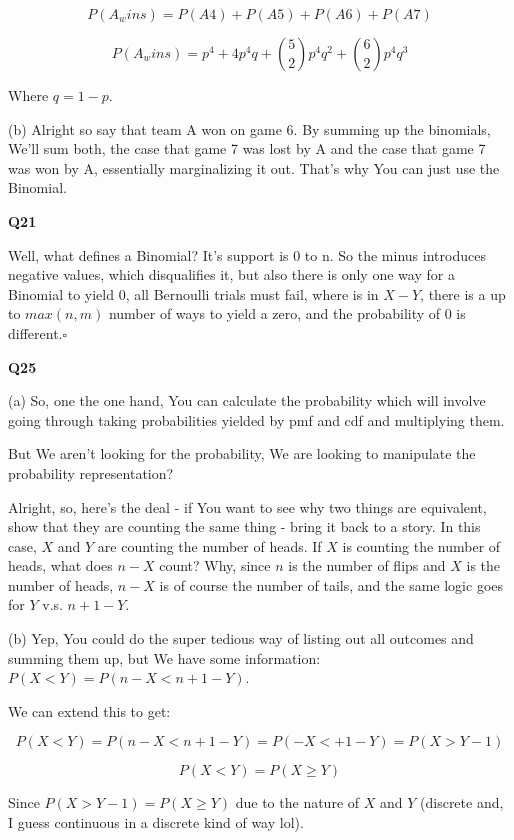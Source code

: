 \documentclass{article}
\newcommand{\qed}{\hfill$\square$}
\begin{document}
			$$P(A_wins) = P(A4) + P(A5) + P(A6) + P(A7)$$
			
			$$P(A_wins) = p^4 + 4p^4q + {5 \choose 2}p^4q^2 + {6 \choose 2}p^4q^3$$
			
			Where $q = 1-p$.
			
			(b) Alright so say that team A won on game 6. By summing up the binomials, We'll sum both, the case that game 7 was lost by A and the case that game 7 was won by A, essentially marginalizing it out. That's why You can just use the Binomial.
			
			\hfill
			
		\textbf{Q21}
		
			Well, what defines a Binomial? It's support is 0 to n. So the minus introduces negative values, which disqualifies it, but also there is only one way for a Binomial to yield 0, all Bernoulli trials must fail, where is in $X-Y$, there is a up to $max(n, m)$ number of ways to yield a zero, and the probability of 0 is different.\qed
			
			\hfill
			
		\textbf{Q25}
			
			(a) So, one the one hand, You can calculate the probability which will involve going through taking probabilities yielded by pmf and cdf and multiplying them.
			
			But We aren't looking for the probability, We are looking to manipulate the probability representation?
			
			Alright, so, here's the deal - if You want to see why two things are equivalent, show that they are counting the same thing - bring it back to a story. In this case, $X$ and $Y$ are counting the number of heads. If $X$ is counting the number of heads, what does $n - X$ count? Why, since $n$ is the number of flips and $X$ is the number of heads, $n - X$ is of course the number of tails, and the same logic goes for $Y$ v.s. $n + 1 - Y$.
			
			(b) Yep, You could do the super tedious way of listing out all outcomes and summing them up, but We have some information: $P(X < Y) = P(n - X < n + 1 - Y)$.
			
			We can extend this to get:
			
			$$P(X<Y)=P(n-X<n+1-Y)=P(-X<+1-Y) = P(X > Y - 1)$$
			
			$$P(X<Y) = P(X \ge Y)$$
			
			Since $P(X > Y - 1) = P(X \ge Y)$ due to the nature of $X$ and $Y$ (discrete and, I guess continuous in a discrete kind of way lol).
			
\end{document}
